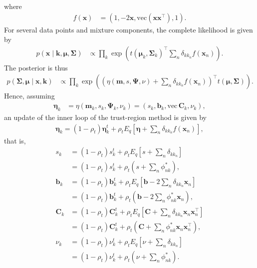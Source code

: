 \documentclass[a4paper]{article}
\begin{document}
	where
	\begin{align}
		f(\mathbf{x}) 
			&= \left(1, -2\mathbf{x}, \text{vec}\left(\mathbf{x}\mathbf{x}^\top\right), 1 \right).
	\end{align}
	For several data points and mixture components, the complete likelihood is given by
	\begin{align}
		p(\mathbf{x} \mid \mathbf{k}, \bm{\mu}, \bm{\Sigma})
			&\propto \prod_k \exp\left( t(\bm{\mu}_k, \bm{\Sigma}_k)^\top \sum_n \delta_{kk_n} f(\mathbf{x}_n) \right).
	\end{align}
	The posterior is thus
	\begin{align}
		p(\bm{\Sigma}, \bm{\mu} \mid \mathbf{x}, \mathbf{k})
			&\propto \prod_k \exp\left( \left( \eta(\mathbf{m}, s, \bm{\Psi}, \nu) + \sum_n \delta_{kk_n} f(\mathbf{x}_n) \right)^\top t(\bm{\mu}, \bm{\Sigma}) \right).
	\end{align}
	Hence, assuming
	\begin{align}
		\bm{\eta}_k 
		&= \eta(\mathbf{m}_k, s_k, \bm{\Psi}_k, \nu_k)
		= \left( s_k, \mathbf{b}_k, \text{vec}\, \mathbf{C}_k, \nu_k \right),
	\end{align}
	an update of the inner loop of the trust-region method is given by
	\begin{align}
		\bm{\eta}_k = (1 - \rho_t) \bm{\eta}_k^t + \rho_t E_q\left[ \bm{\eta} + \sum_n \delta_{kk_n} f(\mathbf{x}_n) \right],
	\end{align}
	that is,
	\begin{align}
		s_k &= (1 - \rho_t) s_k^t + \rho_t E_q\left[ s + \sum_n \delta_{kk_n} \right] \\
			&= (1 - \rho_t) s_k^t + \rho_t \left( s + \sum_n \phi_{nk}^* \right), \\
		\mathbf{b}_k &= (1 - \rho_t) \mathbf{b}_k^t + \rho_t E_q\left[\mathbf{b} - 2 \sum_n \delta_{kk_n} \mathbf{x}_n\right] \\
			&= (1 - \rho_t) \mathbf{b}_k^t + \rho_t \left( \mathbf{b} - 2 \sum_n \phi_{nk}^* \mathbf{x}_n \right), \\
		\mathbf{C}_k &= (1 - \rho_t) \mathbf{C}_k^t + \rho_t E_q\left[\mathbf{C} + \sum_n \delta_{kk_n} \mathbf{x}_n\mathbf{x}_n^\top \right] \\
			&= (1 - \rho_t) \mathbf{C}_k^t + \rho_t \left(\mathbf{C} + \sum_n \phi_{nk}^* \mathbf{x}_n\mathbf{x}_n^\top \right), \\
		\nu_k &= (1 - \rho_t) \nu_k^t + \rho_t E_q\left[\nu + \sum_n \delta_{kk_n} \right] \\
			&= (1 - \rho_t) \nu_k^t + \rho_t \left(\nu + \sum_n \phi_{nk}^* \right).
	\end{align}
\end{document}
